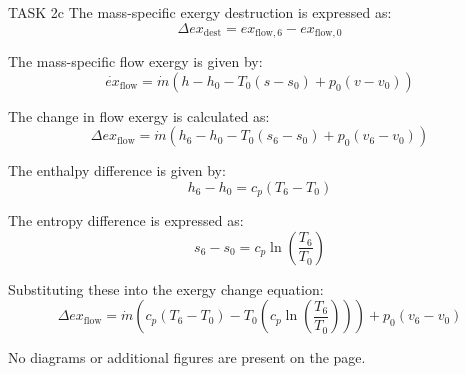 TASK 2c  
The mass-specific exergy destruction is expressed as:  
\[
\Delta ex_{\text{dest}} = ex_{\text{flow},6} - ex_{\text{flow},0}
\]  

The mass-specific flow exergy is given by:  
\[
\dot{ex}_{\text{flow}} = \dot{m} \left( h - h_0 - T_0 (s - s_0) + p_0 (v - v_0) \right)
\]  

The change in flow exergy is calculated as:  
\[
\Delta ex_{\text{flow}} = \dot{m} \left( h_6 - h_0 - T_0 (s_6 - s_0) + p_0 (v_6 - v_0) \right)
\]  

The enthalpy difference is given by:  
\[
h_6 - h_0 = c_p (T_6 - T_0)
\]  

The entropy difference is expressed as:  
\[
s_6 - s_0 = c_p \ln \left( \frac{T_6}{T_0} \right)
\]  

Substituting these into the exergy change equation:  
\[
\Delta ex_{\text{flow}} = \dot{m} \left( c_p (T_6 - T_0) - T_0 \left( c_p \ln \left( \frac{T_6}{T_0} \right) \right) \right) + p_0 (v_6 - v_0)
\]  

No diagrams or additional figures are present on the page.
